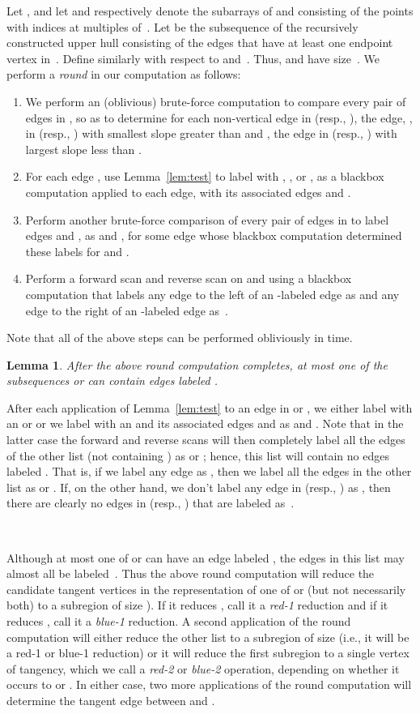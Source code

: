 \documentclass[11pt]{article}
\newenvironment{proof}{\begin{normalsize}\noindent{\bf Proof:}}{  \end{normalsize} \\}
\newcommand{\qed}{}
\newtheorem{lemma}[theorem]{Lemma}
\begin{document}
{Let , and let  and  respectively denote
the subarrays of  and  consisting of the points with indices at
multiples of~.
Let  be the subsequence of the recursively constructed upper hull
 consisting of the edges that have at least one
endpoint vertex in~. Define  similarly with respect to
 and~.
Thus,  and   have size~.
We perform a \emph{round} in our computation as follows:
\begin{enumerate}
\item
We perform an (oblivious)
brute-force computation to compare every pair of edges in
, so as to determine for each non-vertical edge  
in  (resp., ), 
the edge, , in  (resp., ) with smallest slope
greater than  and , the edge in  (resp., )
with largest slope less than .
\item
For each
edge , use Lemma~\ref{lem:test} to label  with , , or , as a
blackbox computation applied to each edge, with its associated edges  and
.
\item
Perform another brute-force comparison of every pair of edges 
in  to label edges  and , as  and , 
for some edge  whose blackbox computation determined these 
labels for  and .
\item
Perform a forward scan and reverse scan on  and  using 
a blackbox computation that
labels any edge to the left of an -labeled edge as  and any edge to the
right of an -labeled edge as~.
\end{enumerate}
Note that all of the above steps can be performed obliviously in  time.

\begin{lemma}
After the above round computation completes,
at most one of the subsequences  or  can contain edges labeled .
\end{lemma}
\begin{proof}
After each application of Lemma~\ref{lem:test} to an edge  in  or
, we either label 
with an  or  or we label  with an  and 
its associated edges  and  as  and .
Note that in the latter case the forward and reverse scans will then
completely label all the edges of the other list (not containing )
as  or ; hence, this list will contain no edges labeled .
That is, if we label any edge  as , then we label all the edges in the
other list as  or .
If, on the other hand, we don't label any edge  in  (resp., ) as
, then there are clearly no edges in  (resp., ) that are labeled
as~.
\qed
\end{proof}

Although at most one of  or  can 
have an edge labeled , the edges in this list may almost all be
labeled~.
Thus the above round computation will reduce the candidate 
tangent vertices in the representation of
one of  or  (but not necessarily both) to a subregion of size 
).
If it reduces , call it a \emph{red-1} reduction and
if it reduces , call it a \emph{blue-1} reduction.
A second application of the round computation will either reduce the other list
to a subregion of size  (i.e., it will be a red-1 or blue-1
reduction) or it will reduce the first subregion
to a single vertex of tangency, which we call a \emph{red-2} or \emph{blue-2}
operation, depending on whether it occurs to  or .
In either case, two more applications of the round computation will determine
the tangent edge between  and .

}
\end{document}
